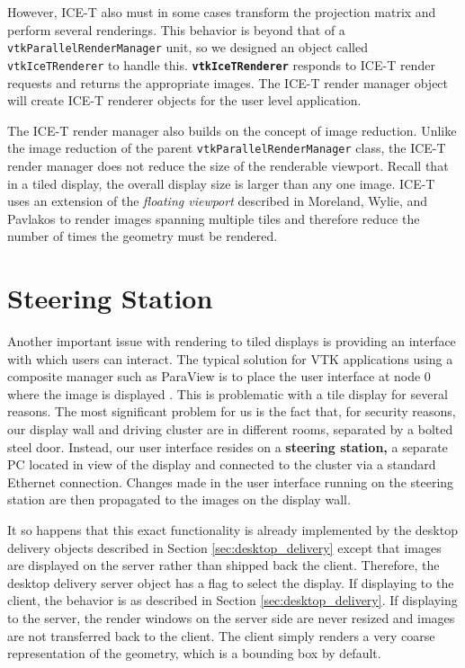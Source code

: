 \documentclass{acmsiggraph}
\newcommand{\cidentifier}[1]{\texttt{#1}}
\newcommand{\keyterm}[1]{\textbf{#1}}
\begin{document}
  However, ICE-T also must in some cases transform the projection matrix
  and perform several renderings.  This behavior is beyond that of a
  \cidentifier{vtk\-Parallel\-Render\-Manager} unit, so we designed an
  object called \cidentifier{vtk\-Ice\-T\-Renderer} to handle this.
  \keyterm{\cidentifier{vtk\-Ice\-T\-Renderer}} responds to ICE-T render
  requests and returns the appropriate images.  The ICE-T render manager
  object will create ICE-T renderer objects for the user level application.

  The ICE-T render manager also builds on the concept of image reduction.
  Unlike the image reduction of the parent
  \cidentifier{vtk\-Parallel\-Render\-Manager} class, the ICE-T render
  manager does not reduce the size of the renderable viewport.  Recall that
  in a tiled display, the overall display size is larger than any one
  image.  ICE-T uses an extension of the \emph{floating viewport} described
  in Moreland, Wylie, and Pavlakos \cite{Moreland01} to render images
  spanning multiple tiles and therefore reduce the number of times the
  geometry must be rendered.


  \section{Steering Station}
  \label{sec:steering_station}

  Another important issue with rendering to tiled displays is providing an
  interface with which users can interact.  The typical solution for VTK
  applications using a composite manager such as ParaView is to place the
  user interface at node 0 where the image is displayed \cite{Law01}.  This
  is problematic with a tile display for several reasons.  The most
  significant problem for us is the fact that, for security reasons, our
  display wall and driving cluster are in different rooms, separated by a
  bolted steel door.  Instead, our user interface resides on a
  \keyterm{steering station,} a separate PC located in view of the display
  and connected to the cluster via a standard Ethernet connection.  Changes
  made in the user interface running on the steering station are then
  propagated to the images on the display wall.

  It so happens that this exact functionality is already implemented by the
  desktop delivery objects described in Section \ref{sec:desktop_delivery}
  except that images are displayed on the server rather than shipped back
  the client.  Therefore, the desktop delivery server object has a flag to
  select the display.  If displaying to the client, the behavior is as
  described in Section \ref{sec:desktop_delivery}.  If displaying to the
  server, the render windows on the server side are never resized and
  images are not transferred back to the client.  The client simply renders
  a very coarse representation of the geometry, which is a bounding box by
  default.
\end{document}
